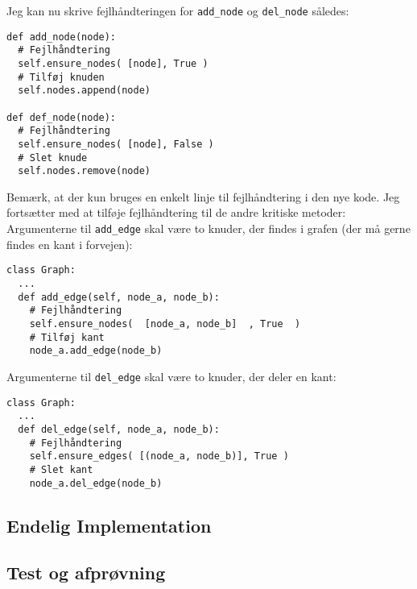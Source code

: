 \documentclass[10pt,a4paper,danish]{article}
\newcommand{\ct}{\texttt}
\begin{document}
Jeg kan nu skrive fejlhåndteringen for \ct{add\_node} og \ct{del\_node}
således:

{\small
\begin{verbatim}
def add_node(node):
  # Fejlhåndtering
  self.ensure_nodes( [node], True )
  # Tilføj knuden
  self.nodes.append(node)

def def_node(node):
  # Fejlhåndtering
  self.ensure_nodes( [node], False )
  # Slet knude
  self.nodes.remove(node)
\end{verbatim}}

Bemærk, at der kun bruges en enkelt linje til fejlhåndtering i den nye
kode. Jeg fortsætter med at tilføje fejlhåndtering til de andre
kritiske metoder: \\

Argumenterne til \ct{add\_edge} skal være to knuder, der findes i
grafen (der må gerne findes en kant i forvejen):
{\small
\begin{verbatim}
class Graph:
  ...
  def add_edge(self, node_a, node_b):
    # Fejlhåndtering
    self.ensure_nodes(  [node_a, node_b]  , True  )
    # Tilføj kant
    node_a.add_edge(node_b)
\end{verbatim}}

Argumenterne til \ct{del\_edge} skal være to knuder, der deler en
kant:
{\small
\begin{verbatim}
class Graph:
  ...
  def del_edge(self, node_a, node_b):
    # Fejlhåndtering
    self.ensure_edges( [(node_a, node_b)], True )
    # Slet kant
    node_a.del_edge(node_b)
\end{verbatim}}

\subsection{Endelig Implementation}
\begin{alltt}

\end{alltt}

\subsection{Test og afprøvning}
\end{document}
